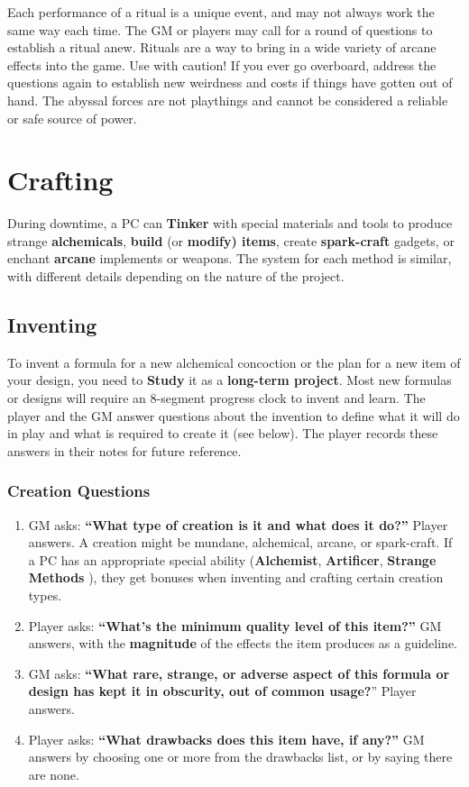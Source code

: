 \documentclass[11pt,oneside]{book}
\newcommand{\gameterm}[1]{\textbf{#1}}
\begin{document}
Each performance of a ritual is a unique event, and may not always work the same way each time. The GM or players may call for a round of questions to establish a ritual anew. Rituals are a way to bring in a wide variety of arcane effects into the game. Use with caution! If you ever go overboard, address the questions again to establish new weirdness and costs if things have gotten out of hand. The abyssal forces are not playthings and cannot be considered a reliable or safe source of power.

\chapter{Crafting}

During downtime, a PC can \gameterm{Tinker}  with special materials and tools to produce strange\textbf{ alchemicals}, \textbf{build} (or \textbf{modify) items},\textbf{ }create \textbf{spark-craft} gadgets, or enchant \textbf{arcane} implements or weapons. The system for each method is similar, with different details depending on the nature of the project.

\section{Inventing}

To invent a formula for a new alchemical concoction or the plan for a new item of your design, you need to \gameterm{Study}  it as a \textbf{long-term project}. Most new formulas or designs will require an 8-segment progress clock to invent and learn. The player and the GM answer questions about the invention to define what it will do in play and what is required to create it (see below). The player records these answers in their notes for future reference.

\subsection{Creation Questions}

\begin{enumerate}
	\item GM asks: \textbf{“What type of creation is it and what does it do?”} Player answers. A creation might be mundane, alchemical, arcane, or spark-craft. If a PC has an appropriate special ability (\gameterm{Alchemist}, \gameterm{Artificer}, \gameterm{Strange Methods} ), they get bonuses when inventing and crafting certain creation types.
	\item Player asks: \textbf{“What’s the minimum quality level of this item?”} GM answers, with the \textbf{magnitude} of the effects the item produces as a guideline.
	\item GM asks: \textbf{“What rare, strange, or adverse aspect of this formula or design has kept it in obscurity, out of common usage?}” Player answers.
	\item Player asks: \textbf{“What drawbacks does this item have, if any?”} GM answers by choosing one or more from the drawbacks list, or by saying there are none.
\end{enumerate}
\end{document}

